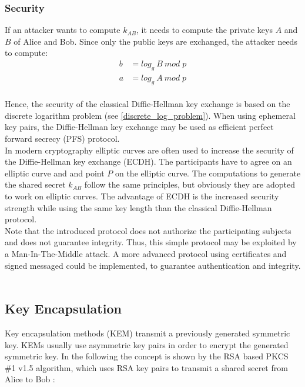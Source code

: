 \subsubsection{Security}
If an attacker wants to compute $k_{AB}$, it needs to compute the private keys $A$ and $B$ of Alice and Bob. Since only the public keys are exchanged, the attacker needs to compute:
\begin{equation*}
\begin{split}
b &= log_g\:B\:mod\;p\\ 
a &= log_g\:A\:mod\;p
\end{split}
\end{equation*}
\\
Hence, the security of the classical Diffie-Hellman key exchange is based on the discrete logarithm problem (see \ref{discrete_log_problem}). When using ephemeral key pairs, the Diffie-Hellman key exchange may be used as efficient perfect forward secrecy (PFS) protocol. ~\parencite{ITSicherheit}
\\
In modern cryptography elliptic curves are often used to increase the security of the Diffie-Hellman key exchange (ECDH). The participants have to agree on an elliptic curve and and point $P$ on the elliptic curve. The computations to generate the shared secret $k_{AB}$ follow the same principles, but obviously they are adopted to work on elliptic curves. The advantage of ECDH is the increased security strength while using the same key length than the classical Diffie-Hellman protocol. ~\parencite{ITSicherheit}
\\
Note that the introduced protocol does not authorize the participating subjects and does not guarantee integrity. Thus, this simple protocol may be exploited by a Man-In-The-Middle attack. A more advanced protocol using certificates and signed messaged could be implemented, to guarantee authentication and integrity. ~\parencite{ITSicherheit}

\subsection{Key Encapsulation}

Key encapsulation methods (KEM) transmit a previously generated symmetric key. KEMs usually use asymmetric key pairs in order to encrypt the generated symmetric key. In the following the concept is shown by the RSA based PKCS \#1 v1.5 algorithm, which uses RSA key pairs to transmit a shared secret from Alice to Bob \parencite{rsakem}:

